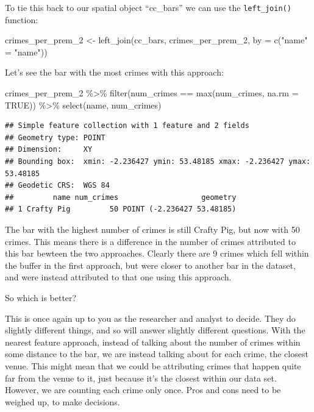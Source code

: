 \documentclass[
]{book}
\newenvironment{Shaded}{\begin{snugshade}}{\end{snugshade}}
\newcommand{\AttributeTok}[1]{\textcolor[rgb]{0.77,0.63,0.00}{#1}}
\newcommand{\ConstantTok}[1]{\textcolor[rgb]{0.00,0.00,0.00}{#1}}
\newcommand{\FunctionTok}[1]{\textcolor[rgb]{0.00,0.00,0.00}{#1}}
\newcommand{\NormalTok}[1]{#1}
\newcommand{\OtherTok}[1]{\textcolor[rgb]{0.56,0.35,0.01}{#1}}
\newcommand{\SpecialCharTok}[1]{\textcolor[rgb]{0.00,0.00,0.00}{#1}}
\newcommand{\StringTok}[1]{\textcolor[rgb]{0.31,0.60,0.02}{#1}}
\begin{document}
To tie this back to our spatial object ``cc\_bars'' we can use the \texttt{left\_join()} function:

\begin{Shaded}
\begin{Highlighting}[]
\NormalTok{crimes\_per\_prem\_2 }\OtherTok{\textless{}{-}} \FunctionTok{left\_join}\NormalTok{(cc\_bars, crimes\_per\_prem\_2, }\AttributeTok{by =} \FunctionTok{c}\NormalTok{(}\StringTok{"name"} \OtherTok{=} \StringTok{"name"}\NormalTok{))}
\end{Highlighting}
\end{Shaded}

Let's see the bar with the most crimes with this approach:

\begin{Shaded}
\begin{Highlighting}[]
\NormalTok{crimes\_per\_prem\_2 }\SpecialCharTok{\%\textgreater{}\%} \FunctionTok{filter}\NormalTok{(num\_crimes }\SpecialCharTok{==} \FunctionTok{max}\NormalTok{(num\_crimes, }\AttributeTok{na.rm =} \ConstantTok{TRUE}\NormalTok{)) }\SpecialCharTok{\%\textgreater{}\%} \FunctionTok{select}\NormalTok{(name, num\_crimes)}
\end{Highlighting}
\end{Shaded}

\begin{verbatim}
## Simple feature collection with 1 feature and 2 fields
## Geometry type: POINT
## Dimension:     XY
## Bounding box:  xmin: -2.236427 ymin: 53.48185 xmax: -2.236427 ymax: 53.48185
## Geodetic CRS:  WGS 84
##         name num_crimes                   geometry
## 1 Crafty Pig         50 POINT (-2.236427 53.48185)
\end{verbatim}

The bar with the highest number of crimes is still Crafty Pig, but now with 50 crimes. This means there is a difference in the number of crimes attributed to this bar bewteen the two approaches. Clearly there are 9 crimes which fell within the buffer in the first approach, but were closer to another bar in the dataset, and were instead attributed to that one using this approach.

So which is better?

This is once again up to you as the researcher and analyst to decide. They do slightly different things, and so will answer slightly different questions. With the nearest feature approach, instead of talking about the number of crimes within some distance to the bar, we are instead talking about for each crime, the closest venue. This might mean that we could be attributing crimes that happen quite far from the venue to it, just because it's the closest within our data set. However, we are counting each crime only once. Pros and cons need to be weighed up, to make decisions.
\end{document}
